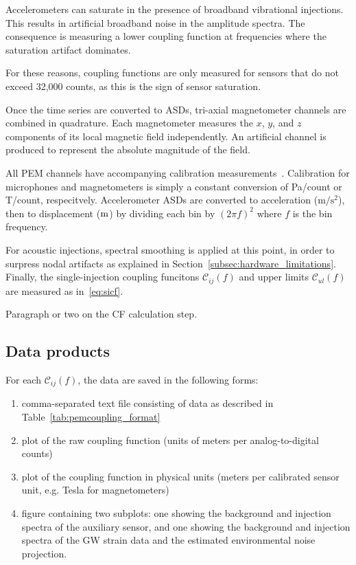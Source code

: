 Accelerometers can saturate in the presence of broadband vibrational injections.
This results in artificial broadband noise in the amplitude spectra.
The consequence is measuring a lower coupling function at frequencies where the saturation artifact dominates.

For these reasons, coupling functions are only measured for sensors that do not exceed 32,000 counts, as this is the sign of sensor saturation.

Once the time series are converted to \acp{ASD}, tri-axial magnetometer channels are combined in quadrature.
Each magnetometer measures the $x$, $y$, and $z$ components of its local magnetic field independently.
An artificial channel is produced to represent the absolute magnitude of the field.

All \ac{PEM} channels have accompanying calibration measurements~\citep{PEM_website}. Calibration for microphones and magnetometers is simply a constant conversion of Pa/count or T/count, respecitvely.
Accelerometer \acp{ASD} are converted to acceleration ($\mathrm{m/s^2}$), then to displacement ($\meter$) by dividing each bin by $(2\pi f)^2$ where $f$ is the bin frequency.

For acoustic injections, spectral smoothing is applied at this point, in order to surpress nodal artifacts as explained in Section~\ref{subsec:hardware_limitations}.
Finally, the single-injection coupling funcitons $\mathcal{C}_{ij}(f)$ and upper limits $\mathcal{C}_{ul}(f)$ are measured as in~\cref{eq:sicf}.

{\color{red}
Paragraph or two on the CF calculation step.}

\subsection{Data products}

For each $\mathcal{C}_{ij}(f)$, the data are saved in the following forms:
\begin{enumerate}
	\item comma-separated text file consisting of data as described in Table~\ref{tab:pemcoupling_format}
	\item plot of the  raw coupling function (units of meters per analog-to-digital counts)
	\item plot of the coupling function in physical units (meters per calibrated sensor unit, e.g. Tesla for magnetometers)
	\item figure containing two subplots: one showing the background and injection spectra of the auxiliary sensor, and one showing the background and injection spectra of the \ac{GW} strain data and the estimated environmental noise projection.
\end{enumerate}

